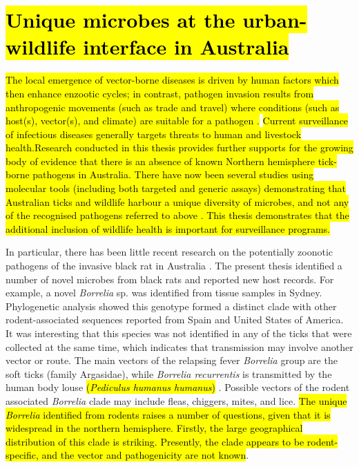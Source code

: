 \documentclass[a4paper, nobind]{templates/ociamthesis}
\begin{document}
\hypertarget{unique-microbes-at-the-urban-wildlife-interface-in-australia}{%
\section{\texorpdfstring{\hl{Unique microbes at the urban-wildlife interface in Australia}}{Unique microbes at the urban-wildlife interface in Australia}}\label{unique-microbes-at-the-urban-wildlife-interface-in-australia}}

\hl{The local emergence of vector-borne diseases is driven by human factors which then enhance enzootic cycles; in contrast, pathogen invasion results from anthropogenic movements (such as trade and travel) where conditions (such as host(s), vector(s), and climate) are suitable for a pathogen \autocite{kilpatrickDriversDynamicsControl2012}.}
\hl{Current surveillance of infectious diseases generally targets threats to human and livestock health.Research conducted in this thesis provides further supports for the growing body of evidence that there is an absence of known Northern hemisphere tick-borne pathogens in Australia. There have now been several studies using molecular tools (including both targeted and generic assays) demonstrating that Australian ticks and wildlife harbour a unique diversity of microbes, and not any of the recognised pathogens referred to above \autocite{goftonBacterialProfilingReveals2015,eganBacterialCommunityProfiling2020,hussain-yusufScreeningRickettsiaCoxiella2020}. This thesis demonstrates that the additional inclusion of wildlife health is important for surveillance programs.}

In particular, there has been little recent research on the potentially zoonotic pathogens of the invasive black rat in Australia \autocite{banksReviewEvidencePotential2012}.
The present thesis identified a number of novel microbes from black rats and reported new host records.
For example, a novel \emph{Borrelia} sp. was identified from tissue samples in Sydney.
Phylogenetic analysis showed this genotype formed a distinct clade with other rodent-associated sequences reported from Spain and United States of America.
It was interesting that this species was not identified in any of the ticks that were collected at the same time, which indicates that transmission may involve another vector or route.
The main vectors of the relapsing fever \emph{Borrelia} group are the soft ticks (family Argasidae), while \emph{Borrelia recurrentis} is transmitted by the human body louse \hl{(\emph{Pediculus humanus humanus})} \autocite{gilIdentificationNewBorrelia2005}.
Possible vectors of the rodent associated \emph{Borrelia} clade may include fleas, chiggers, mites, and lice.
\hl{The unique \emph{Borrelia} identified from rodents raises a number of questions, given that it is widespread in the northern hemisphere. Firstly, the large geographical distribution of this clade is striking. Presently, the clade appears to be rodent-specific, and the vector and pathogenicity are not known}.
\end{document}
